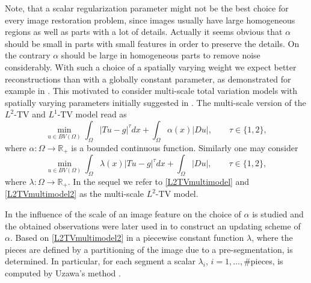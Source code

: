 \documentclass[enabledeprecatedfontcommands,cleardoublepage=empty,headsepline,twoside,11pt,DIV=15,BCOR=12mm,final]{scrartcl}
\newcommand{\R}{{\mathbb R}}
\begin{document}
Note, that a scalar regularization parameter might not be the best choice for every image restoration problem, since images usually have large homogeneous regions as well as parts with a lot of details. Actually it seems obvious that $\alpha$ should be small in parts with small features in order to preserve the details. On the contrary $\alpha$ should be large in homogeneous parts to remove noise considerably. With such a choice of a spatially varying weight we expect better reconstructions than with a globally constant parameter, as demonstrated for example in \cite{DonHinRin,HinRin}. 
 This motivated to consider multi-scale total variation models with spatially varying parameters initially suggested in \cite{RudOsh}. The multi-scale version of the $L^2$-TV and $L^1$-TV model read as
\begin{equation}\label{L2TVmultimodel}
\min_{u\in BV(\Omega)}  \int_\Omega |Tu-g|^\tau dx + \int_\Omega \alpha(x) |Du|, \qquad \tau\in \{1,2\},
\end{equation}
where $\alpha: \Omega \to \R_+$ is a bounded continuous function. Similarly one may consider
\begin{equation}\label{L2TVmultimodel2}
\min_{u\in BV(\Omega)} \int_\Omega \lambda(x) |Tu-g|^\tau dx +  \int_\Omega |Du|, \qquad \tau\in \{1,2\},
\end{equation}
where $\lambda: \Omega \to \R_+$. In the sequel we refer to \eqref{L2TVmultimodel} and \eqref{L2TVmultimodel2} as the multi-scale $L^2$-TV model.

In \cite{StrCha1996} the influence of the scale of an image feature on the choice of $\alpha$ is studied and the obtained observations were later used in \cite{StrBloCha1997} to construct an updating scheme of $\alpha$. Based on \eqref{L2TVmultimodel2} in \cite{BerCasRouSol} a piecewise constant function $\lambda$, where the pieces are defined by a partitioning of the image due to a pre-segmentation, is determined. In particular, for each segment a scalar $\lambda_i$, $i=1,\ldots,\#$pieces, is computed by Uzawa's method \cite{Cia}.
\end{document}
